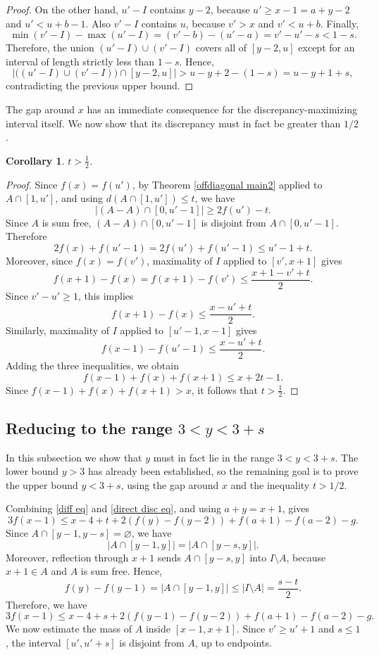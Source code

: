 \documentclass[11pt,reqno]{amsart}
\newtheorem{cor}[thm]{Corollary}
\theoremstyle{definition}
\def\F#1{f(#1)}
\begin{document}
\begin{proof}
On the other hand, $u'-I$ contains $y-2$, because $u'\geq x-1=a+y-2$ and
$u'<u+b-1$. Also $v'-I$ contains $u$, because $v'>x$ and $v'<u+b$.
Finally,
$$
    \min(v'-I)-\max(u'-I)
    =
    (v'-b)-(u'-a)
    =
    v'-u'-s
    <1-s.
$$
Therefore,   the union $(u'-I)\cup(v'-I)$ covers all of $[y-2,u]$ except for
an interval of length strictly less than $1-s$. Hence,  
$$
    \left| \bigl((u'-I)\cup(v'-I)\bigr)\cap[y-2,u]\right|
    >
    u-y+2-(1-s)
    =
    u-y+1+s,
$$
contradicting the previous upper bound.
\end{proof}

The gap around $x$ has an immediate consequence for the discrepancy-maximizing interval itself. We now show that its discrepancy must in fact be greater than $1/2$.
\begin{cor} \label{rough t bound}
    $t > \frac{1}{2}$. 
\end{cor}

\begin{proof}
Since $\F{x}=\F{u'}$, by Theorem \ref{offdiagonal main2} applied to
$A\cap[1,u']$, and using $d(A\cap[1,u'])\leq t$, we have
$$
    |(A-A)\cap[0,u'-1]|\geq 2\F{u'}-t.
$$
Since $A$ is sum free, $(A-A)\cap[0,u'-1]$ is disjoint from
$A\cap[0,u'-1]$. Therefore
$$
    2\F{x}+\F{u'-1}=2\F{u'}+\F{u'-1}\leq u'-1+t.
$$
Moreover, since $\F{x}=\F{v'}$, maximality of $I$ applied to $[v',x+1]$ gives
$$
    \F{x+1}-\F{x}
    =
    \F{x+1}-\F{v'}
    \leq \frac{x+1-v'+t}{2}.
$$
Since $v'-u'\geq1$, this implies
$$
    \F{x+1}-\F{x}
    \leq \frac{x-u'+t}{2}.
$$
Similarly, maximality of $I$ applied to $[u'-1,x-1]$ gives
$$
    \F{x-1}-\F{u'-1}
    \leq \frac{x-u'+t}{2}.
$$
Adding the three inequalities, we obtain
$$
    \F{x-1}+\F{x}+\F{x+1}
    \leq x+2t-1.
$$
Since $\F{x-1}+\F{x}+\F{x+1}>x$, it follows that $t>\frac12$.
\end{proof}
\subsection{Reducing to the range $3<y<3+s$}
In this subsection we show that $y$ must in fact lie in the range $3<y<3+s$. The lower bound $y>3$ has already been established, so the remaining goal is to prove the upper bound $y<3+s$, using the gap around $x$ and the inequality $t>1/2$.

Combining \eqref{diff eq} and \eqref{direct disc eq}, and using
$a+y=x+1$, gives
$$
    3\F{x - 1}
    \leq
    x - 4 + t
    +2(\F{y}-\F{y-2})
    +\F{a+1}-\F{a-2}
    -g .
$$
Since $A\cap[y-1,y-s]=\varnothing$, we have
$$
    |A\cap[y-1,y]|=|A\cap[y-s,y]|.
$$
Moreover, reflection through $x+1$ sends $A\cap[y-s,y]$ into
$I\setminus A$, because $x+1\in A$ and $A$ is sum free. Hence,  
$$
    \F{y}-\F{y-1}
    =
    |A\cap[y-1,y]|
    \leq
    |I\setminus A|
    =
    \frac{s-t}{2}.
$$
Therefore,   we have
\begin{equation} \label{three Fxminus estimate}
    3\F{x - 1}
    \leq
    x - 4 + s
    +2(\F{y-1}-\F{y-2})
    +\F{a+1}-\F{a-2}
    -g .
\end{equation}
We now estimate the mass of $A$ inside $[x-1,x+1]$. Since
$v'\geq u'+1$ and $s\leq1$, the interval $[u',u'+s]$ is disjoint from $A$,
up to endpoints.
\end{document}
